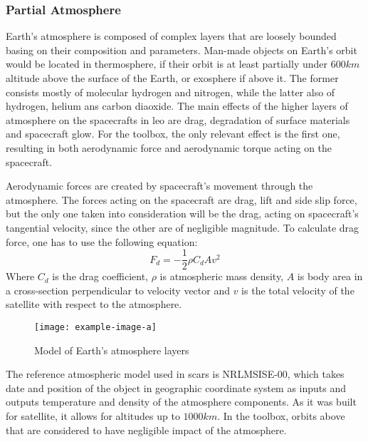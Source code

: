     \subsubsection{Partial Atmosphere}
        Earth's atmosphere is composed of complex layers that are loosely bounded basing on their composition and parameters. Man-made objects on Earth's orbit would be located in thermosphere, if their orbit is at least partially under $600km$ altitude above the surface of the Earth, or exosphere if above it. The former consists mostly of molecular hydrogen and nitrogen, while the latter also of hydrogen, helium ans carbon diaoxide. The main effects of the higher layers of atmosphere on the spacecrafts in \ac{leo} are drag, degradation of surface materials and spacecraft glow. For the toolbox, the only relevant effect is the first one, resulting in both aerodynamic force and aerodynamic torque acting on the spacecraft.

        Aerodynamic forces are created by spacecraft's movement through the atmosphere. The forces acting on the spacecraft are drag, lift and side slip force, but the only one taken into consideration will be the drag, acting on spacecraft's tangential velocity, since the other are of negligible magnitude. To calculate drag force, one has to use the following equation:
        \begin{equation}
            F_d = -\frac{1}{2}\rho C_d A v^2
        \end{equation}
        Where $C_d$ is the drag coefficient, $\rho$ is atmospheric mass density, $A$ is body area in a cross-section perpendicular to velocity vector and $v$ is the total velocity of the satellite with respect to the atmosphere. 


        \begin{figure}[hb]
            \centering
            \texttt{[image: example-image-a]}
            \caption{Model of Earth's atmosphere layers}
            \label{fig:atmosphere}
        \end{figure}

        The reference atmospheric model used in \ac{scars} is NRLMSISE-00, which takes date and position of the object in geographic coordinate system as inputs and outputs temperature and density of the atmosphere components. As it was built for satellite, it allows for altitudes up to $1000km$. In the toolbox, orbits above that are considered to have negligible impact of the atmosphere.
